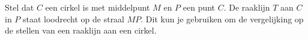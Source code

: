 \vspace{2mm} Stel dat $C$ een cirkel is met middelpunt $M$ en $P$ een punt $C$.
De raaklijn $T$ aan $C$ in $P$ staat loodrecht op de straal $MP$.
Dit kun je gebruiken om de vergelijking op de stellen van een raaklijn aan een cirkel.

%
%
%
%
%

